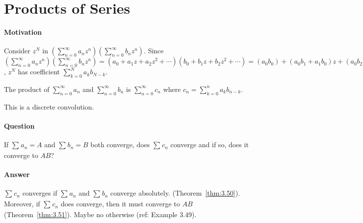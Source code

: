 \section{Products of Series}
\paragraph{Motivation}
Consider $z^{N}$ in $(\sum_{n=0}^{\infty}{a_{n}z^{n}})(\sum_{n=0}^{\infty}{b_{n}z^{n}})$.
Since $(\sum_{n=0}^{\infty}{a_{n}z^{n}})(\sum_{n=0}^{\infty}{b_{n}z^{n}})
	=(a_0+a_1z+a_2z^2+\cdots)(b_0+b_1z+b_2z^2+\cdots)=(a_0b_0)+(a_0b_1+a_1b_0)z+(a_0b_2+a_1b_1+a_2b_0)z^2+\cdots$, $z^{N}$ has coefficient $\sum_{k=0}^{N}{a_kb_{N-k}}$.
\begin{definition}
	The product of $\sum_{n=0}^{\infty}{a_{n}}$ and $\sum_{n=0}^{\infty}{b_{n}}$ is $\sum_{n=0}^{\infty}{c_{n}}$ where $c_{n}=\sum_{k=0}^{n}{a_kb_{n-k}}$.
	\begin{note}
		This is a discrete convolution.
	\end{note}
\end{definition}

\paragraph{Question}
If $\sum_{}{a_{n}}=A$ and $\sum_{}{b_{n}}=B$ both converge, does $\sum_{}{c_{n}}$ converge and if so, does it converge to $AB$?
\paragraph{Answer}
$\sum_{}{c_{n}}$ converges if $\sum_{}{a_{n}}$ and $\sum_{}{b_{n}}$ converge absolutely. (Theorem~\ref{thm:3.50}). Moreover, if $\sum_{}{c_{n}}$ does converge, then it must converge to $AB$ (Theorem~\ref{thm:3.51}). Maybe no otherwise (ref: Example 3.49).


